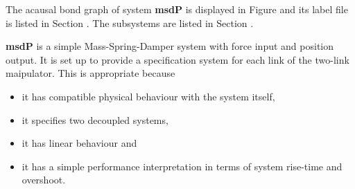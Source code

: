

   The acausal bond graph of system \textbf{msdP} is
   displayed in Figure  and its label
   file is listed in Section .
   The subsystems are listed in Section .


 \textbf{msdP} is a simple Mass-Spring-Damper system with 
 force input and position output. It is set up to provide a specification system
 for each link of the two-link maipulator. This is appropriate because
 \begin{itemize}
 \item  it has compatible physical behaviour with the system itself,
 \item it specifies two decoupled systems,
 \item it has linear behaviour and
 \item it has a simple performance interpretation in terms of system
   rise-time and overshoot.
 \end{itemize}

